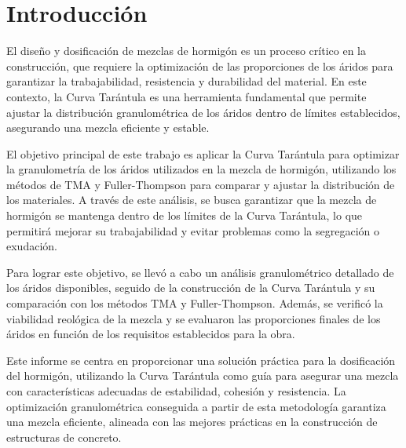\section{Introducción}

El diseño y dosificación de mezclas de hormigón es un proceso crítico en la construcción, que requiere la optimización de las proporciones de los áridos para garantizar la trabajabilidad, resistencia y durabilidad del material. En este contexto, la Curva Tarántula es una herramienta fundamental que permite ajustar la distribución granulométrica de los áridos dentro de límites establecidos, asegurando una mezcla eficiente y estable.

El objetivo principal de este trabajo es aplicar la Curva Tarántula para optimizar la granulometría de los áridos utilizados en la mezcla de hormigón, utilizando los métodos de TMA y Fuller-Thompson para comparar y ajustar la distribución de los materiales. A través de este análisis, se busca garantizar que la mezcla de hormigón se mantenga dentro de los límites de la Curva Tarántula, lo que permitirá mejorar su trabajabilidad y evitar problemas como la segregación o exudación.

Para lograr este objetivo, se llevó a cabo un análisis granulométrico detallado de los áridos disponibles, seguido de la construcción de la Curva Tarántula y su comparación con los métodos TMA y Fuller-Thompson. Además, se verificó la viabilidad reológica de la mezcla y se evaluaron las proporciones finales de los áridos en función de los requisitos establecidos para la obra.

Este informe se centra en proporcionar una solución práctica para la dosificación del hormigón, utilizando la Curva Tarántula como guía para asegurar una mezcla con características adecuadas de estabilidad, cohesión y resistencia. La optimización granulométrica conseguida a partir de esta metodología garantiza una mezcla eficiente, alineada con las mejores prácticas en la construcción de estructuras de concreto.
